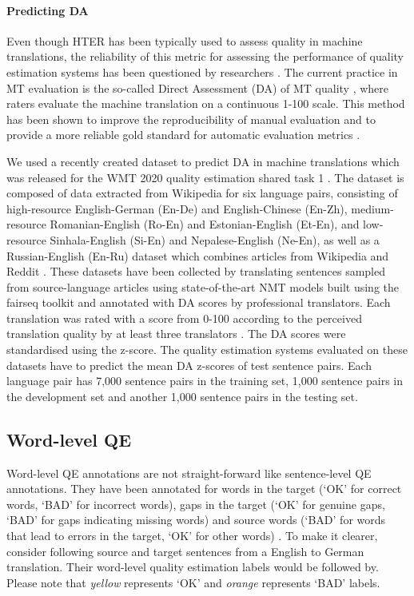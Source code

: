\paragraph{Predicting DA}
Even though HTER has been typically used to assess quality in machine translations, the reliability of this metric for assessing the performance of quality estimation systems has been questioned by researchers \autocite{graham-etal-2016-glitters}. The current practice in MT evaluation is the so-called Direct Assessment (DA) of MT quality \autocite{graham_baldwin_moffat_zobel_2017}, where raters evaluate the machine translation on a continuous 1-100 scale. This method has been shown to improve the reproducibility of manual evaluation and to provide a more reliable gold standard for automatic evaluation metrics \autocite{graham-etal-2015-accurate}. 

We used a recently created dataset to predict DA in machine translations which was released for the WMT 2020 quality estimation shared task 1 \autocite{specia-etal-2020-findings-wmt}. The dataset is composed of data extracted from Wikipedia for six language pairs, consisting of high-resource English-German (En-De) and English-Chinese (En-Zh), medium-resource Romanian-English (Ro-En) and Estonian-English (Et-En), and low-resource Sinhala-English (Si-En) and Nepalese-English (Ne-En), as well as a Russian-English (En-Ru) dataset which combines articles from Wikipedia and Reddit \autocite{fomicheva-etal-2020-unsupervised}. These datasets have been collected by translating sentences sampled from source-language articles using state-of-the-art NMT models built using the fairseq toolkit \autocite{ott-etal-2019-fairseq} and annotated with DA scores by professional translators. Each translation was rated with a score from 0-100 according to the perceived translation quality by at least three translators \autocite{specia-etal-2020-findings-wmt}. The DA scores were standardised using the z-score. The quality estimation systems evaluated on these datasets have to predict the mean DA z-scores of test sentence pairs. Each language pair has 7,000 sentence pairs in the training set, 1,000 sentence pairs in the development set and another 1,000 sentence pairs in the testing set. 

\subsection{Word-level QE}
Word-level QE annotations are not straight-forward like sentence-level QE annotations. They have been annotated for words in the target (`OK' for correct words, `BAD' for incorrect words), gaps in the target (`OK' for genuine gaps, `BAD' for gaps indicating missing words) and source words (`BAD' for words that lead to errors in the target, `OK' for other words) \autocite{specia-etal-2018-findings}. To make it clearer, consider following source and target sentences from a English to German translation. Their word-level quality estimation labels would be followed by. Please note that \textit{yellow} represents `OK' and \textit{orange} represents `BAD' labels. 


